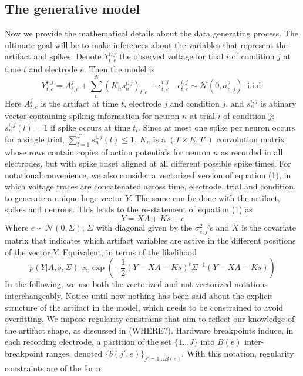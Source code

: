 \documentclass[12pt,letterpaper,fleqn]{article}
\begin{document}
\subsection{The generative model}
Now we provide the mathematical details about the data generating process. The ultimate goal will be to make inferences about the variables that represent the artifact and spikes.
 Denote $Y_{t,e}^{i,j}$ the observed voltage for trial $i$ of condition $j$ at time $t$ and electrode $e$. Then the model is
\begin{equation} Y_{t,e}^{i,j}=A_{t,e}^j+\sum_n^N (K_n s_n^{i,j})_{t,e}+\epsilon_{t,e}^{i,j}\quad\epsilon_{t,e}^{i,j} \sim \mathcal{N}\left(0,\sigma^2_{e,j}\right) \;\; \text{i.i.d }\end{equation}
Here $A_{t,e}^j$  is the artifact at time $t$, electrode $j$ and condition $j$, and $s_n^{i,j}$ is abinary vector containing spiking information for neuron $n$ at trial $i$ of condition $j$: $s_n^{i,j}(l)=1$ if spike occurs at time $t_{l}$. Since at most one spike per neuron occurs for a single trial, $ \sum_{l=1}^{T'}s_n^{i,j}(l)\leq1$. $K_n$ is a $(T\times E, T')$ convolution matrix whose rows contain copies of action potentials for neuron $n$ as recorded in all electrodes, but with spike onset aligned at all different possible spike times. For notational convenience, we also consider a vectorized version of equation (1), in which voltage traces are concatenated across time, electrode, trial and condition, to generate a unique huge vector $Y$. The same can be done with the artifact, spikes and neurons. This leads to the re-statement of equation (1) as
\begin{equation}
Y=XA+Ks+\epsilon
\end{equation}
Where $\epsilon \sim \mathcal{N}(0,\Sigma)$, $\Sigma$ with diagonal given by the $\sigma^2_{e,j}$'s  and $X$ is the covariate matrix that indicates which artifact variables are active in the different positions of the vector $Y$. Equivalent, in terms of the likelihood
$$p(Y|A,s,\Sigma)\propto \exp\left(-\dfrac{1}{2}(Y-XA-Ks)^t\Sigma^{-1}(Y-XA-Ks)\right)$$
In the following, we use both the vectorized and not vectorized notations interchangeably. Notice until now nothing has been said about the explicit structure of the artifact in the model, which needs to be constrained to avoid overfitting. We impose regularity constrains that aim to reflect our knowledge of the artifact shape, as discussed in (WHERE?). Hardware breakpoints induce, in each recording electrode, a partition of the set $\{1\ldots J\}$ into $B(e)$ inter-breakpoint ranges, denoted $\{b(j',e)\}_{j'=1\ldots B(e)}$. With this notation, regularity constraints are of the form:%
\end{document}
